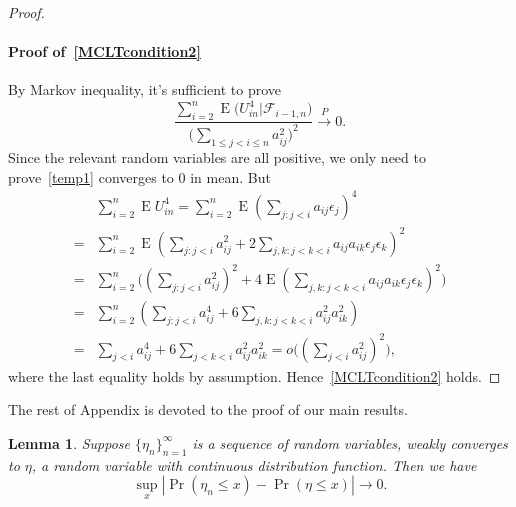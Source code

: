 \documentclass[review]{elsarticle}
\DeclareMathOperator{\myE}{E}
\theoremstyle{plain}
\newtheorem{lemma}{Lemma}
\theoremstyle{definition}
\theoremstyle{remark}
\begin{document}
\begin{proof}
     \paragraph{Proof of~\eqref{MCLTcondition2}}
     By Markov inequality, it's sufficient to prove
     \begin{equation}\label{temp1}
         \frac{\sum_{i=2}^n \myE\big(U_{in}^4\big|\mathcal{F}_{i-1,n}\big)}{{\big(\sum_{1\leq j<i\leq n} a_{ij}^2\big)}^2}\xrightarrow{P} 0.
     \end{equation}
     Since the relevant random variables are all positive, we only need to prove~\eqref{temp1} converges to $0$ in mean. But
     \begin{equation*}
         \begin{aligned}
             &\sum_{i=2}^n \myE U_{in}^4
             =
             \sum_{i=2}^n \myE {(\sum_{j:j<i}a_{ij}\epsilon_j)}^4\\
             =&
             \sum_{i=2}^n \myE {(\sum_{j:j<i}a_{ij}^2+2\sum_{j,k:j<k<i}a_{ij}a_{ik}\epsilon_j \epsilon_k)}^2\\
             =&
             \sum_{i=2}^n  \big({(\sum_{j:j<i}a_{ij}^2)}^2+4\myE{(\sum_{j,k:j<k<i}a_{ij}a_{ik}\epsilon_j \epsilon_k)}^2 \big)\\
             =&
             \sum_{i=2}^n  (\sum_{j:j<i}a_{ij}^4+6\sum_{j,k:j<k<i}a_{ij}^2 a_{ik}^2)\\
             =&
             \sum_{j<i}a_{ij}^4+6\sum_{j<k<i}a_{ij}^2 a_{ik}^2
             =
             o\big({(\sum_{j<i} a_{ij}^2)}^2\big),
         \end{aligned}
     \end{equation*}
     where the last equality holds by assumption. Hence~\eqref{MCLTcondition2} holds.
 \end{proof}

The rest of Appendix is devoted to the proof of our main results.
\begin{lemma}\label{lemmaUniformSimple}
    Suppose $\{\eta_n\}_{n=1}^{\infty}$ is a sequence of random variables, weakly converges to $\eta$, a random variable with continuous distribution function.
    Then we have
    \begin{equation*}
    \sup_{x}|\Pr(\eta_n\leq x)-\Pr(\eta\leq x)|\to 0.
    \end{equation*}
\end{lemma}
\end{document}
